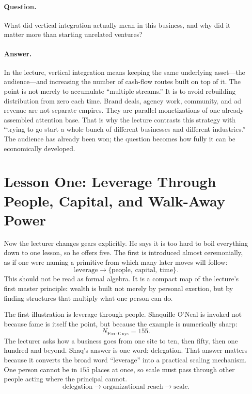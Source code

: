 \paragraph{Question.} What did vertical integration actually mean in this business, and why did it matter more than starting unrelated ventures?

\paragraph{Answer.} In the lecture, vertical integration means keeping the same underlying asset---the audience---and increasing the number of cash-flow routes built on top of it. The point is not merely to accumulate ``multiple streams.'' It is to avoid rebuilding distribution from zero each time. Brand deals, agency work, community, and ad revenue are not separate empires. They are parallel monetizations of one already-assembled attention base. That is why the lecture contrasts this strategy with ``trying to go start a whole bunch of different businesses and different industries.'' The audience has already been won; the question becomes how fully it can be economically developed.

\section{Lesson One: Leverage Through People, Capital, and Walk-Away Power}

Now the lecturer changes gears explicitly. He says it is too hard to boil everything down to one lesson, so he offers five. The first is introduced almost ceremonially, as if one were naming a primitive from which many later moves will follow:
\begin{equation}
\text{leverage} \to \{\text{people},\ \text{capital},\ \text{time}\}.
\end{equation}
This should not be read as formal algebra. It is a compact map of the lecture's first master principle: wealth is built not merely by personal exertion, but by finding structures that multiply what one person can do.

The first illustration is leverage through people. Shaquille O'Neal is invoked not because fame is itself the point, but because the example is numerically sharp:
\begin{equation}
N_{\text{Five Guys}} = 155.
\end{equation}
The lecturer asks how a business goes from one site to ten, then fifty, then one hundred and beyond. Shaq's answer is one word: delegation. That answer matters because it converts the broad word ``leverage'' into a practical scaling mechanism. One person cannot be in \(155\) places at once, so scale must pass through other people acting where the principal cannot.
\begin{equation}
\text{delegation} \to \text{organizational reach} \to \text{scale}.
\end{equation}

